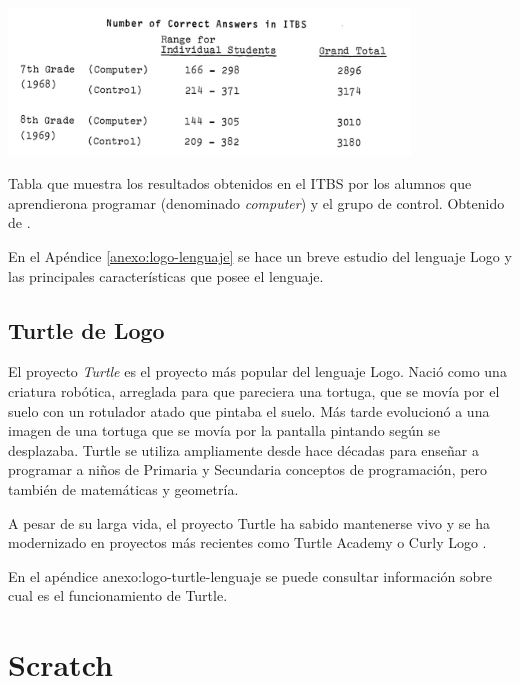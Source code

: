 \begin{table}[!ht]
	\begin{centering}
		\includegraphics[width=0.8\textwidth]{images/logo-itbs.png}
			\caption{Tabla que muestra los resultados obtenidos en el ITBS por los alumnos que aprendierona programar (denominado \emph{computer}) y el grupo de control. Obtenido de \cite[p.251]{feurzeig1969programming}.}
				\label{tab:logo-itbs}
	\end{centering}
\end{table}


En el Apéndice \ref{anexo:logo-lenguaje} se hace un breve estudio del lenguaje Logo y las principales características que posee el lenguaje.



\subsection{Turtle de Logo}
\label{sec:turtle}

El proyecto \emph{Turtle} es el proyecto más popular del lenguaje Logo. Nació como una criatura robótica, arreglada para que pareciera una tortuga, que se movía por el suelo con un rotulador atado que pintaba el suelo. Más tarde evolucionó a una imagen de una tortuga que se movía por la pantalla pintando según se desplazaba. Turtle se utiliza ampliamente desde hace décadas para enseñar a programar a niños de Primaria y Secundaria conceptos de programación, pero también de matemáticas y geometría\cite{abelson1980disessa,brown1995101}.

A pesar de su larga vida, el proyecto Turtle ha sabido mantenerse vivo y se ha modernizado en proyectos más recientes como Turtle Academy \cite{turtle-academy} o Curly Logo \cite{curly-logo}.

En el apéndice {anexo:logo-turtle-lenguaje} se puede consultar información sobre cual es el funcionamiento de Turtle.


\section{Scratch}
\label{sec:scratch}


